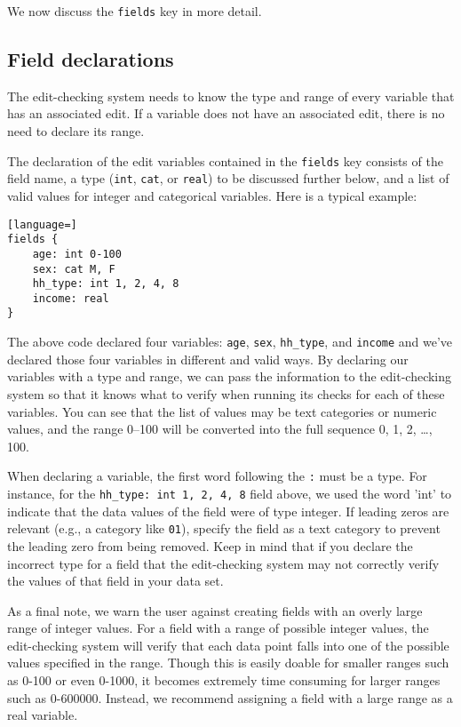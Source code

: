 \documentclass{article}
\begin{document}
{

    
}

We now discuss the {\tt fields} key in more detail.


\subsection{Field declarations} The edit-checking system needs to know the type and range
of every variable that has an associated edit. If a variable does not have an associated
edit, there is no need to declare its range.

The declaration of the edit variables contained in the {\tt fields} key consists of the field name, 
a type ({\tt int}, {\tt cat}, or 
{\tt real}) to be discussed further below, and a list of valid values for integer and categorical variables. Here is a typical example:

\begin{lstlisting}[language=]
fields {
    age: int 0-100
    sex: cat M, F
    hh_type: int 1, 2, 4, 8
    income: real
}
\end{lstlisting}

The above code declared four variables: {\tt age}, {\tt sex}, {\tt hh\_type}, and {\tt income} and we've 
declared those four variables in different and valid ways.
By declaring our variables with a type and range, we can pass the information to the edit-checking system 
so that it knows what to verify when running its checks for each of these variables. 
You can see that the list of values may be text categories
or numeric values, and the range 0--100 will be converted into the full sequence 0, 1, 2, \dots, 100. 

When declaring a variable, the first word following the {\tt :} must be a type. For instance, 
for the {\tt hh\_type: int 1, 2, 4, 8} field above, we used the word 'int' to indicate that 
the data values of the field were of type integer. If leading zeros are relevant (e.g.,
a category like {\tt 01}), specify the field as a text category to prevent the leading
zero from being removed.  Keep in mind 
that if you declare the incorrect type for a field that the edit-checking system may not correctly 
verify the values of that field in your data set.

As a final note, we warn the user against creating fields with an overly large range of integer 
values. For a field with a range of possible integer values, the edit-checking system will verify 
that each data point falls into one of the possible values specified in the range. Though
this is easily doable for smaller ranges such as 0-100 or even 0-1000, it becomes
extremely time consuming for larger ranges such as 0-600000. Instead, we recommend
assigning a field with a large range as a real variable.
\end{document}
